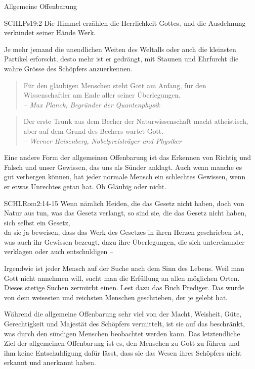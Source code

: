 \begin{otsblock}{Allgemeine Offenbarung}
    \begin{bibelbox}{SCHL}{Ps}{19:2}
        Die Himmel erzählen die Herrlichkeit Gottes, und die Ausdehnung verkündet seiner Hände Werk.
    \end{bibelbox}
    Je mehr jemand die unendlichen Weiten des Weltalls oder auch die kleinsten Partikel erforscht, desto mehr ist er gedrängt, mit Staunen und Ehrfurcht die wahre Grösse des Schöpfers anzuerkennen.

    \begin{quote}
        Für den gläubigen Menschen steht Gott am Anfang, für den Wissenschaftler am Ende aller seiner Überlegungen.\\
        \hfill\textit{-- Max Planck, Begründer der Quantenphysik}
    \end{quote}
    \begin{quote}
        Der erste Trunk aus dem Becher der Naturwissenschaft macht atheistisch, aber auf dem Grund des Bechers wartet Gott.\\
        \hfill\textit{-- Werner Heisenberg, Nobelpreisträger und Physiker}
    \end{quote}

    Eine andere Form der allgemeinen Offenbarung ist das Erkennen von Richtig und Falsch und unser Gewissen, das uns als Sünder anklagt. Auch wenn manche es gut verbergen können, hat jeder normale Mensch ein schlechtes Gewissen, wenn er etwas Unrechtes getan hat. Ob Gläubig oder nicht.
    \begin{bibelbox}{SCHL}{Rom}{2:14-15}
        Wenn nämlich Heiden, die das Gesetz nicht haben, doch von Natur aus tun, was das Gesetz verlangt, so sind sie, die das Gesetz nicht haben, sich selbst ein Gesetz,\\
        da sie ja beweisen, dass das Werk des Gesetzes in ihren Herzen geschrieben ist, was auch ihr Gewissen bezeugt, dazu ihre Überlegungen, die sich untereinander verklagen oder auch entschuldigen --
    \end{bibelbox}

    Irgendwie ist jeder Mensch auf der Suche nach dem Sinn des Lebens. Weil man Gott nicht annehmen will, sucht man die Erfüllung an allen möglichen Orten. Dieses stetige Suchen zermürbt einen. Lest dazu das Buch Prediger. Das wurde von dem weisesten und reichsten Menschen geschrieben, der je gelebt hat.

    Während die allgemeine Offenbarung sehr viel von der Macht, Weisheit, Güte, Gerechtigkeit und Majestät des Schöpfers vermittelt, ist sie auf das beschränkt, was durch den sündigen Menschen beobachtet werden kann. Das letztendliche Ziel der allgemeinen Offenbarung ist es, den Menschen zu Gott zu führen und ihm keine Entschuldigung dafür lässt, dass sie das Wesen ihres Schöpfers nicht erkannt und anerkannt haben.


\end{otsblock}
